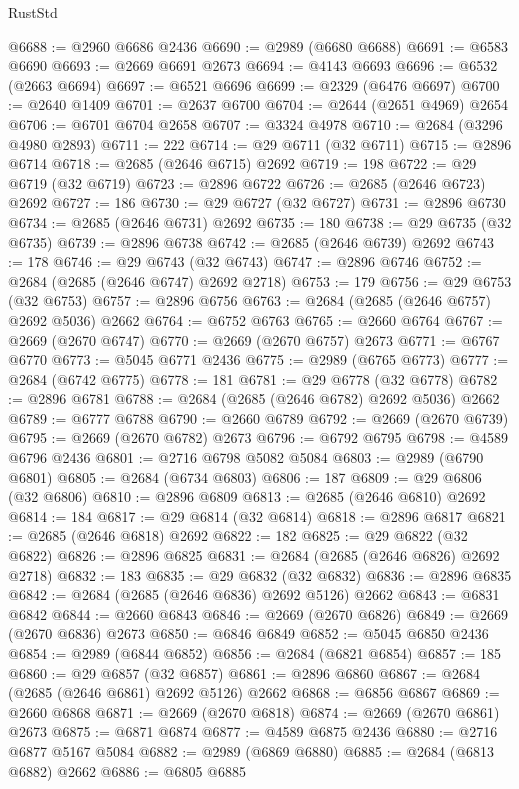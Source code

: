 \begin{lexlean}{RustStd}
\begin{coremodule}
@6688 := @2960 @6686 @2436
@6690 := @2989 (@6680 @6688)
@6691 := @6583 @6690
@6693 := @2669 @6691 @2673
@6694 := @4143 @6693
@6696 := @6532 (@2663 @6694)
@6697 := @6521 @6696
@6699 := @2329 (@6476 @6697)
@6700 := @2640 @1409
@6701 := @2637 @6700
@6704 := @2644 (@2651 @4969) @2654
@6706 := @6701 @6704 @2658
@6707 := @3324 @4978
@6710 := @2684 (@3296 @4980 @2893)
@6711 := 222
@6714 := @29 @6711 (@32 @6711)
@6715 := @2896 @6714
@6718 := @2685 (@2646 @6715) @2692
@6719 := 198
@6722 := @29 @6719 (@32 @6719)
@6723 := @2896 @6722
@6726 := @2685 (@2646 @6723) @2692
@6727 := 186
@6730 := @29 @6727 (@32 @6727)
@6731 := @2896 @6730
@6734 := @2685 (@2646 @6731) @2692
@6735 := 180
@6738 := @29 @6735 (@32 @6735)
@6739 := @2896 @6738
@6742 := @2685 (@2646 @6739) @2692
@6743 := 178
@6746 := @29 @6743 (@32 @6743)
@6747 := @2896 @6746
@6752 := @2684 (@2685 (@2646 @6747) @2692 @2718)
@6753 := 179
@6756 := @29 @6753 (@32 @6753)
@6757 := @2896 @6756
@6763 := @2684 (@2685 (@2646 @6757) @2692 @5036) @2662
@6764 := @6752 @6763
@6765 := @2660 @6764
@6767 := @2669 (@2670 @6747)
@6770 := @2669 (@2670 @6757) @2673
@6771 := @6767 @6770
@6773 := @5045 @6771 @2436
@6775 := @2989 (@6765 @6773)
@6777 := @2684 (@6742 @6775)
@6778 := 181
@6781 := @29 @6778 (@32 @6778)
@6782 := @2896 @6781
@6788 := @2684 (@2685 (@2646 @6782) @2692 @5036) @2662
@6789 := @6777 @6788
@6790 := @2660 @6789
@6792 := @2669 (@2670 @6739)
@6795 := @2669 (@2670 @6782) @2673
@6796 := @6792 @6795
@6798 := @4589 @6796 @2436
@6801 := @2716 @6798 @5082 @5084
@6803 := @2989 (@6790 @6801)
@6805 := @2684 (@6734 @6803)
@6806 := 187
@6809 := @29 @6806 (@32 @6806)
@6810 := @2896 @6809
@6813 := @2685 (@2646 @6810) @2692
@6814 := 184
@6817 := @29 @6814 (@32 @6814)
@6818 := @2896 @6817
@6821 := @2685 (@2646 @6818) @2692
@6822 := 182
@6825 := @29 @6822 (@32 @6822)
@6826 := @2896 @6825
@6831 := @2684 (@2685 (@2646 @6826) @2692 @2718)
@6832 := 183
@6835 := @29 @6832 (@32 @6832)
@6836 := @2896 @6835
@6842 := @2684 (@2685 (@2646 @6836) @2692 @5126) @2662
@6843 := @6831 @6842
@6844 := @2660 @6843
@6846 := @2669 (@2670 @6826)
@6849 := @2669 (@2670 @6836) @2673
@6850 := @6846 @6849
@6852 := @5045 @6850 @2436
@6854 := @2989 (@6844 @6852)
@6856 := @2684 (@6821 @6854)
@6857 := 185
@6860 := @29 @6857 (@32 @6857)
@6861 := @2896 @6860
@6867 := @2684 (@2685 (@2646 @6861) @2692 @5126) @2662
@6868 := @6856 @6867
@6869 := @2660 @6868
@6871 := @2669 (@2670 @6818)
@6874 := @2669 (@2670 @6861) @2673
@6875 := @6871 @6874
@6877 := @4589 @6875 @2436
@6880 := @2716 @6877 @5167 @5084
@6882 := @2989 (@6869 @6880)
@6885 := @2684 (@6813 @6882) @2662
@6886 := @6805 @6885

\end{coremodule}
\end{lexlean}
